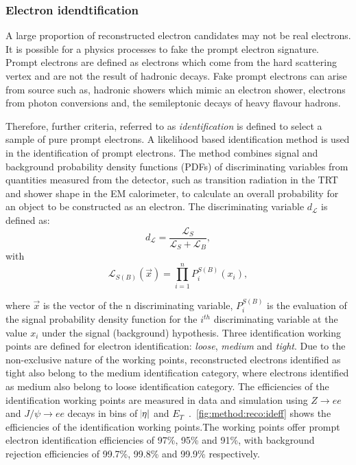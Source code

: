 \subsubsection{Electron idendtification}
A large proportion of reconstructed electron candidates may not be real electrons. It is possible for a physics processes to fake the prompt electron signature. Prompt electrons are defined as electrons which come from the hard scattering vertex and are not the result of hadronic decays. Fake prompt electrons can arise from source such as, hadronic showers which mimic an electron shower, electrons from photon conversions and, the semileptonic decays of heavy flavour hadrons.

Therefore, further criteria, referred to as \emph{identification} is defined to select a sample of pure prompt electrons. A likelihood based identification method is used in the identification of prompt electrons. The method combines signal and background probability density functions (PDFs) of discriminating variables from quantities measured from the detector, such as transition radiation in the TRT and shower shape in the EM calorimeter, to calculate an overall probability for an object to be constructed as an electron. The discriminating variable $d_\mathcal{L}$ is defined as:
\begin{equation}
    d_{\mathcal{L}} = \frac{\mathcal{L}_S}{\mathcal{L}_S + \mathcal{L}_B},  
\end{equation}
with 
\begin{equation}
    \mathcal{L}_{S(B)}(\overrightarrow{x}) = \prod_{i=1}^{n} P_{i}^{S(B)} (x_{i}),
\end{equation}

where $\overrightarrow{x}$ is the vector of the n discriminating variable,  $P_{i}^{S(B)}$ is the evaluation of the signal probability density function for the $i^{th}$ discriminating variable at the value $x_i$ under the signal (background) hypothesis. Three identification working points are defined for electron identification: \emph{loose}, \emph{medium} and \emph{tight}. Due to the non-exclusive nature of the working points, reconstructed electrons identified as tight also belong to the medium identification category, where electrons identified as medium also belong to loose identification category. The efficiencies of the identification working points are measured in data and simulation using $Z \rightarrow ee$ and $J/\psi \rightarrow ee$ decays in bins of $\abs{\eta}$ and $E_T$~\cite{Aad:2019tso}.~\cref{fig:method:reco:ideff} shows the efficiencies of the identification working points.The working points offer prompt electron identification efficiencies of 97\%, 95\% and 91\%, with background rejection efficiencies of 99.7\%, 99.8\% and 99.9\% respectively. 

